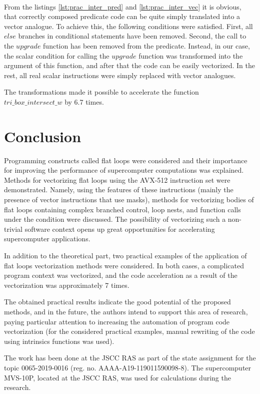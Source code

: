 \documentclass[
11pt,%
tightenlines,%
twoside,%
onecolumn,%
nofloats,%
nobibnotes,%
nofootinbib,%
superscriptaddress,%
noshowpacs,%
centertags]%
{revtex4}
\begin{document}
\ \\

From the listings \ref{lst:prac_inter_pred} and \ref{lst:prac_inter_vec} it is obvious, that correctly composed predicate code can be quite simply translated into a vector analogue.
To achieve this, the following conditions were satisfied.
First, all $else$ branches in conditional statements have been removed.
Second, the call to the $upgrade$ function has been removed from the predicate.
Instead, in our case, the scalar condition for calling the $upgrade$ function was transformed into the argument of this function, and after that the code can be easily vectorized.
In the rest, all real scalar instructions were simply replaced with vector analogues.

The transformations made it possible to accelerate the function \\
$tri\_box\_intersect\_w$ by 6.7 times.

\section{Conclusion}

Programming constructs called flat loops were considered and their importance for improving the performance of supercomputer computations was explained.
Methods for vectorizing flat loops using the AVX-512 instruction set were demonstrated.
Namely, using the features of these instructions (mainly the presence of vector instructions that use masks), methods for vectorizing bodies of flat loops containing complex branched control, loop nests, and function calls under the condition were discussed.
The possibility of vectorizing such a non-trivial software context opens up great opportunities for accelerating supercomputer applications.

In addition to the theoretical part, two practical examples of the application of flat loops vectorization methods were considered.
In both cases, a complicated program context was vectorized, and the code acceleration as a result of the vectorization was approximately 7 times.

The obtained practical results indicate the good potential of the proposed methods, and in the future, the authors intend to support this area of research, paying particular attention to increasing the automation of program code vectorization (for the considered practical examples, manual rewriting of the code using intrinsics functions was used).

\begin{acknowledgments}
The work has been done at the JSCC RAS as part of the state assignment for the topic 0065-2019-0016 (reg. no. AAAA-A19-119011590098-8).
The supercomputer MVS-10P, located at the JSCC RAS, was used for calculations during the research.
\end{acknowledgments}
\end{document}
